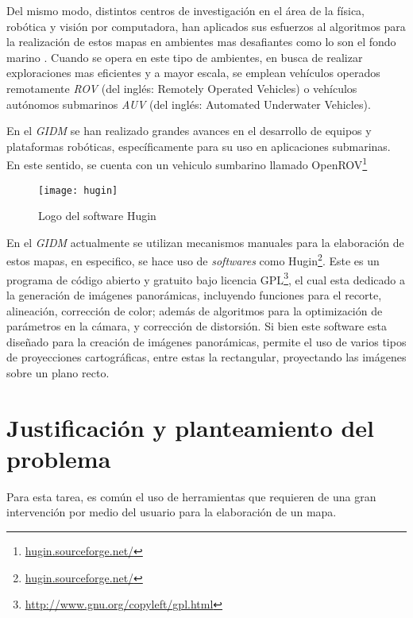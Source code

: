 Del mismo modo, distintos centros de investigación en el área de la física, robótica y visión por computadora, han aplicados sus esfuerzos al algoritmos para la realización de estos mapas en ambientes mas desafiantes como lo son el fondo marino \cite{gracias-victor,Pizarro-singh,eustice,Allais}. Cuando se opera en este tipo de ambientes, en busca de realizar exploraciones mas eficientes y a mayor escala, se emplean vehículos operados remotamente \textit{ROV} (del inglés: Remotely Operated Vehicles) o vehículos autónomos submarinos \textit{AUV} (del inglés: Automated Underwater Vehicles). 

En el \textit{GIDM} se han realizado grandes avances en el desarrollo de equipos y plataformas robóticas, específicamente para su uso en aplicaciones submarinas. En este sentido, se cuenta con un vehiculo sumbarino llamado OpenROV\footnote{\url{hugin.sourceforge.net/}}

\begin{wrapfigure}{r}{0.3\textwidth}
	\begin{center}
		\texttt{[image: hugin]}
	\end{center}
	\caption{Logo del software Hugin}
\end{wrapfigure}

En el \textit{GIDM} actualmente se utilizan mecanismos manuales para la elaboración de estos mapas, en especifico, se hace uso de \textit{softwares} como Hugin\footnote{\url{hugin.sourceforge.net/}}. Este es un programa de código abierto y gratuito bajo licencia GPL\footnote{\url{http://www.gnu.org/copyleft/gpl.html}}, el cual esta dedicado a la generación de imágenes panorámicas, incluyendo funciones para el recorte, alineación, corrección de color; además de algoritmos para la optimización de parámetros en la cámara, y corrección de distorsión. Si bien este software esta diseñado para la creación de imágenes panorámicas, permite el uso de varios tipos de proyecciones cartográficas, entre estas la rectangular, proyectando las imágenes sobre un plano recto.

 

\section{Justificación y planteamiento del problema}

Para esta tarea, es común el uso de herramientas que requieren de una gran intervención por medio del usuario para la elaboración de un mapa.
    
